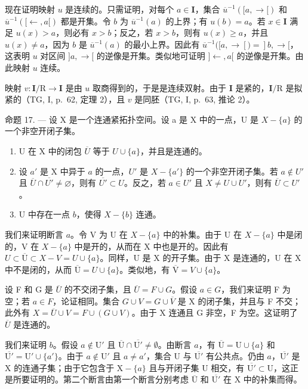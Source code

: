 现在证明映射 \(u\) 是连续的。只需证明，对每个 \(a \in \mathbf{I}\)，集合 \(\overline{u}^{-1}([a, \to[)\) 和 \(\overline{u}^{-1}([\leftarrow, a[)\) 都是开集。令 \(b\) 为 \(\overline{u}^{-1}(a)\) 的上界；有 \(u(b) = a\)。若 \(x \in \mathbf{I}\) 满足 \(u(x) > a\)，则必有 \(x > b\)；反之，若 \(x > b\)，则有 \(u(x) \geqslant a\)，并且 \(u(x) \neq a\)，因为 \(b\) 是 \(\overline{u}^{-1}(a)\) 的最小上界。因此有 \(\overline{u}^{-1}([a, \to[) = ]b, \to[\)，这表明 \(u\) 对区间 \(]a, \to[\) 的逆像是开集。类似地可证明 \(]\leftarrow, a[\) 的逆像是开集。由此映射 \(u\) 连续。

映射 \(v \colon \mathbf{I} / \mathrm{R} \to \mathbf{I}\) 是由 \(u\) 取商得到的，于是是连续双射。由于 \(\mathbf{I}\) 是紧的，\(\mathbf{I} / \mathrm{R}\) 是拟紧的（TG, I, p.~62, 定理 2），且 \(v\) 是同胚（TG, I, p.~63, 推论 2）。

命题 17. --- 设 X 是一个连通紧拓扑空间。设 a 是 X 中的一点，U 是 \(X - \{a\}\) 的一个非空开闭子集。

\begin{enumerate}
\def\labelenumi{\alph{enumi})}
\item
  U 在 X 中的闭包 \(\overline{U}\) 等于 \(U \cup \{a\}\)，并且是连通的。
\item
  设 \(a'\) 是 X 中异于 \(a\) 的一点，\(U'\) 是 \(X - \{a'\}\) 的一个非空开闭子集。若 \(a \notin U'\) 且 \(\overline{U} \cap \overline{U'} \neq \varnothing\)，则有 \(\overline{U'} \subset U\)。反之，若 \(a \in U'\) 且 \(X \neq U \cup U'\)，则有 \(\overline{U} \subset U'\)。
\item
  U 中存在一点 \(b\)，使得 \(X - \{b\}\) 连通。
\end{enumerate}

我们来证明断言 \(a\)。令 V 为 U 在 \(X - \{a\}\) 中的补集。由于 U 在 \(X - \{a\}\) 中是闭的，V 在 \(X - \{a\}\) 中是开的，从而在 X 中也是开的。因此有 \(U \subset \overline{\mathrm{U}} \subset X - V = U \cup \{a\}\)。同样，U 是 X 的开子集。由于 X 是连通的，U 在 X 中不是闭的，从而 \(\overline{\mathrm{U}} = U \cup \{a\}\)。类似地，有 \(\overline{\mathrm{V}} = V \cup \{a\}\)。

设 F 和 G 是 \(\overline{U}\) 的不交闭子集，且 \(\overline{U} = F \cup G\)。假设 \(a \in G\)，我们来证明 F 为空；若 \(a \in F\)，论证相同。集合 \(G \cup V = G \cup \overline{V}\) 是 X 的闭子集，并且与 F 不交；此外有 \(X = \overline{U} \cup V = F \cup (G \cup V)\)。由于 X 连通且 G 非空，F 为空。这证明了 \(\overline{U}\) 是连通的。

我们来证明 \(b\)。假设 \(a \notin \mathrm{U}'\) 且 \(\overline{\mathrm{U}} \cap \overline{\mathrm{U}'} \neq \emptyset\)。由断言 \(a\)，有 \(\overline{\mathrm{U}} = \mathrm{U} \cup \{a\}\) 和 \(\overline{\mathrm{U}'} = \mathrm{U}' \cup \{a'\}\)。由于 \(a \notin \mathrm{U}'\) 且 \(a \neq a'\)，集合 U 与 \(\overline{\mathrm{U}'}\) 有公共点。仍由 \(a\)，\(\overline{\mathrm{U}'}\) 是 X 的连通子集；由于它包含于 \(\mathrm{X} - \{a\}\) 且与开闭子集 U 相交，有 \(\overline{\mathrm{U}'} \subset \mathrm{U}\)，这正是所要证明的。第二个断言由第一个断言分别考虑 \(\overline{\mathrm{U}}\) 和 \(\overline{\mathrm{U}'}\) 在 X 中的补集而得。

